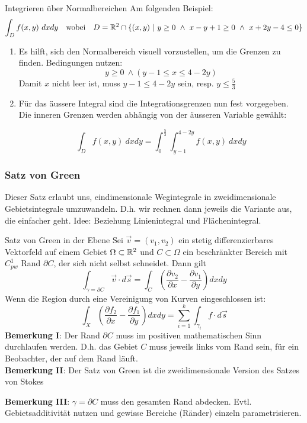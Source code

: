\begin{Rezept}{Integrieren über Normalbereichen}{}
Am folgenden Beispiel:
\[ \int_D f(x, y) ~ dx dy ~~ \text{ wobei } ~~ D = \mathbb{R}^2 \cap \{(x, y) ~ | ~ y \geq 0 ~ \wedge ~ x-y+1\geq 0 ~ \wedge ~ x+2y-4 \leq 0\}\]
\begin{enumerate}
\item {
Es hilft, sich den Normalbereich visuell vorzustellen, um die Grenzen
zu finden. Bedingungen nutzen:
\[ y \geq 0 ~ \wedge (y-1 \leq x \leq 4-2y) \]
Damit $x$ nicht leer ist, muss $y-1 \leq 4-2y$ sein, resp. $y \leq \frac{5}{3}$ 
}
\item {
Für das äussere Integral sind die Integrationsgrenzen nun fest vorgegeben. Die inneren Grenzen
werden abhängig von der äusseren Variable gewählt:

\[ \int_D f(x,y) ~ dx dy = \int_0^{\frac{5}{3}} \int_{y-1}^{4-2y} f(x,y) ~ dx dy \]

}
\end{enumerate}
\end{Rezept}

\subsubsection{Satz von Green}

Dieser Satz erlaubt uns, eindimensionale Wegintegrale in zweidimensionale Gebietsintegrale umzuwandeln. D.h. wir rechnen dann jeweils die Variante aus, die einfacher geht.
Idee: Beziehung Linienintegral und Flächenintegral.


\begin{Satz}{Satz von Green in der Ebene}{}
	Sei $\vec{v} = (v_1, v_2)$ ein stetig differenzierbares Vektorfeld auf einem Gebiet $\Omega \subset \mathbb{R}^2$ und $C \subset \Omega$ ein beschränkter Bereich mit $C^1_{pw}$ Rand $\partial C$, der sich nicht selbst schneidet. Dann gilt
	\[
		\int_{\gamma=\partial C} \vec{v} \cdot d\vec{s} = 
		\int_C \left(\frac{\partial v_2}{\partial x} - \frac{\partial v_1}{\partial y}\right) dxdy
	\]
	Wenn die Region durch eine Vereinigung von Kurven eingeschlossen ist:\\
	\[
		\displaystyle\int_X\left(\frac{\partial f_2}{\partial x}-\frac{\partial f_1}{\partial y}\right)dxdy = \sum_{i=1}^k\int_{\gamma_i}f\cdot d\vec s	
	\]
	\textbf{Bemerkung I}: Der Rand $\partial C$ muss im positiven mathematischen Sinn durchlaufen werden. D.h. das Gebiet $C$ muss jeweils links vom Rand sein, für ein Beobachter, der auf dem Rand läuft.\\
	
	\textbf{Bemerkung II}: Der Satz von Green ist die zweidimensionale Version des Satzes von Stokes
	
	\textbf{Bemerkung III}: $\gamma=\partial C$ muss den gesamten Rand abdecken. Evtl. Gebietsadditivität nutzen und gewisse Bereiche (Ränder) einzeln parametrisieren.
\end{Satz}

